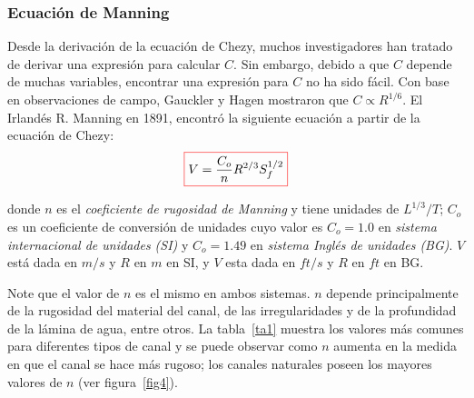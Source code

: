 \documentclass[11pt, oneside]{article}
\begin{document}
\subsubsection{Ecuaci\'on de Manning}
Desde la derivaci\'on de la ecuaci\'on de Chezy, muchos investigadores han tratado de derivar una expresi\'on para calcular $C$. Sin embargo, debido a que $C$ depende de muchas variables, encontrar una expresión para $C$ no ha sido fácil. Con base en observaciones de campo, Gauckler y Hagen mostraron que $C \propto R^{1/6}$. El Irlandés R. Manning en 1891, encontró la siguiente ecuaci\'on a partir de la ecuaci\'on de Chezy:
\begin{equation}
\color{red}\boxed{\color{black} V = \frac{C_o }{n} R^{2/3} S_f^{1/2}}
\label{eq16}
\end{equation}

donde $n$ es el \emph{coeficiente de rugosidad de Manning} y tiene unidades de $L^{1/3} /T$; $C_o$ es un coeficiente de conversi\'on de unidades cuyo valor es $C_o = 1.0$ en \emph{sistema internacional de unidades (SI)} y $C_o = 1.49$ en \emph{sistema Ingl\'es de unidades (BG)}. $V$ est\'a dada en $m/s$ y $R$ en $m$ en SI, y $V$ esta dada en $ft/s$ y $R$ en $ft$ en BG.
 
Note que el valor de $n$ es el mismo en ambos sistemas. $n$ depende principalmente de la rugosidad del material del canal, de las irregularidades y de la profundidad de la l\'amina de agua, entre otros. La tabla~\ref{ta1} muestra los valores m\'as comunes para diferentes tipos de canal y se puede observar como $n$ aumenta en la medida en que el canal se hace m\'as rugoso; los canales naturales poseen los mayores valores de $n$ (ver figura~\ref{fig4}).   
\end{document}
